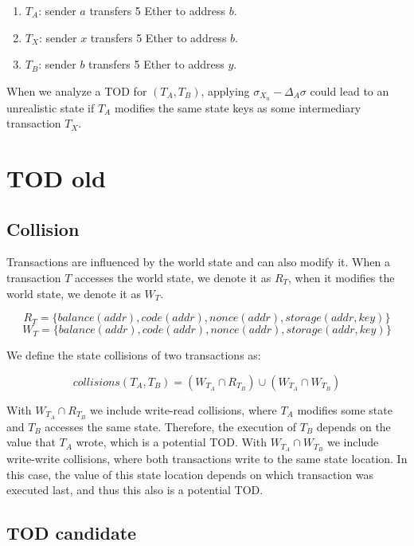 \documentclass[draft,final]{vutinfth} %
\begin{document}
\begin{enumerate}
    \item $T_A$: sender $a$ transfers 5 Ether to address $b$.
    \item $T_X$: sender $x$ transfers 5 Ether to address $b$.
    \item $T_B$: sender $b$ transfers 5 Ether to address $y$.
\end{enumerate}

When we analyze a TOD for $(T_A, T_B)$, applying $\sigma_{X_n} - \Delta_A\sigma$ could lead to an unrealistic state if $T_A$ modifies the same state keys as some intermediary transaction $T_X$.


\section{TOD old}

\subsection{Collision}

Transactions are influenced by the world state and can also modify it. When a transaction $T$ accesses the world state, we denote it as $R_T$, when it modifies the world state, we denote it as $W_T$.

$$R_T = \{ balance(addr), code(addr), nonce(addr), storage(addr, key) \}$$
$$W_T = \{ balance(addr), code(addr), nonce(addr), storage(addr, key) \}$$

We define the state collisions of two transactions as:

$$collisions(T_A, T_B) = (W_{T_A} \cap R_{T_B}) \cup (W_{T_A} \cap W_{T_B})$$ 

With $W_{T_A} \cap R_{T_B}$ we include write-read collisions, where $T_A$ modifies some state and $T_B$ accesses the same state. Therefore, the execution of $T_B$ depends on the value that $T_A$ wrote, which is a potential TOD. With $W_{T_A} \cap W_{T_B}$ we include write-write collisions, where both transactions write to the same state location. In this case, the value of this state location depends on which transaction was executed last, and thus this also is a potential TOD.

\subsection{TOD candidate}
\end{document}
